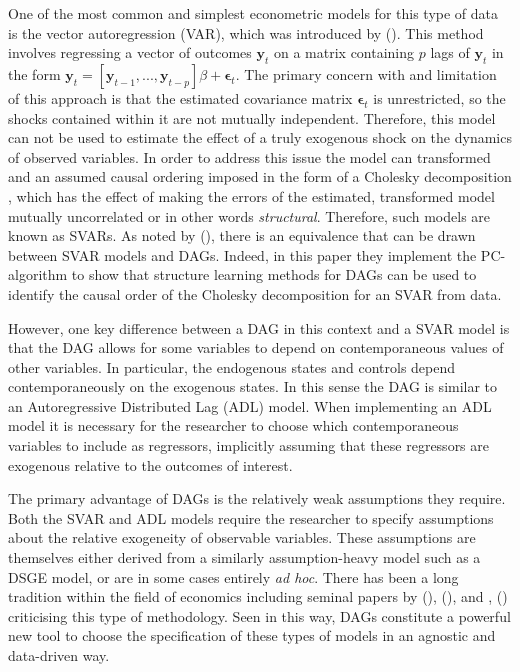 \documentclass{article}
\begin{document}
One of the most common and simplest econometric models for this type of data is the vector autoregression (VAR), which was introduced by \citeauthor{sims1980macroeconomics} (\citeyear{sims1980macroeconomics}). This method involves regressing a vector of outcomes $\mathbf{y}_t$ on a matrix containing $p$ lags of $\mathbf{y}_t$ in the form $\mathbf{y}_t = [\mathbf{y}_{t-1}, ..., \mathbf{y}_{t-p}] \beta + \mathbf{\epsilon}_t $. The primary concern with and limitation of this approach is that the estimated covariance matrix $\mathbf{\epsilon}_t$ is unrestricted, so the shocks contained within it are not mutually independent. Therefore, this model can not be used to estimate the effect of a truly exogenous shock on the dynamics of observed variables. In order to address this issue the model can transformed and an assumed causal ordering imposed in the form of a Cholesky decomposition \parencite{sims1980macroeconomics}, which has the effect of making the errors of the estimated, transformed model mutually uncorrelated or in other words \textit{structural}. Therefore, such models are known as SVARs. As noted by \citeauthor{demiralp2003searching} (\citeyear{demiralp2003searching}), there is an equivalence that can be drawn between SVAR models and DAGs. Indeed, in this paper they implement the PC-algorithm \parencite{spirtes1991algorithm} to show that structure learning methods for DAGs can be used to identify the causal order of the Cholesky decomposition for an SVAR from data.

However, one key difference between a DAG in this context and a SVAR model is that the DAG allows for some variables to depend on contemporaneous values of other variables. In particular, the endogenous states and controls depend contemporaneously on the exogenous states. In this sense the DAG is similar to an Autoregressive Distributed Lag (ADL) model. When implementing an ADL model it is necessary for the researcher to choose which contemporaneous variables to include as regressors, implicitly assuming that these regressors are exogenous relative to the outcomes of interest. 

The primary advantage of DAGs is the relatively weak assumptions they require. Both the SVAR and ADL models require the researcher to specify assumptions about the relative exogeneity of observable variables. These assumptions are themselves either derived from a similarly assumption-heavy model such as a DSGE model, or are in some cases entirely \textit{ad hoc}. There has been a long tradition within the field of economics including seminal papers by \citeauthor{lucas1976econometric} (\citeyear{lucas1976econometric}), \citeauthor{sims1980macroeconomics} (\citeyear{sims1980macroeconomics}), and \citeauthor{jorda2005estimation}, (\citeyear{jorda2005estimation}) criticising this type of methodology. Seen in this way, DAGs constitute a powerful new tool to choose the specification of these types of models in an agnostic and data-driven way.
\end{document}
